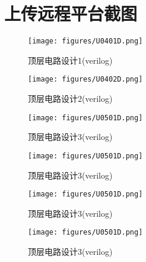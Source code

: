 \documentclass[12pt,hyperref,a4paper,UTF8]{ctexart}
\begin{document}
\section{上传远程平台截图}


\begin{figure}[H]
    \centering
    \begin{minipage}{1\textwidth}
        \centering
        \texttt{[image: figures/U0401D.png]}
        \caption{顶层电路设计1(verilog)}
        \label{fig:system_block_diagram}
    \end{minipage}
\end{figure}

\begin{figure}[H]
    \centering
    \begin{minipage}{1\textwidth}
        \centering
        \texttt{[image: figures/U0402D.png]}
        \caption{顶层电路设计2(verilog)}
        \label{fig:system_block_diagram}
    \end{minipage}
\end{figure}

\begin{figure}[H]
    \centering
    \begin{minipage}{1\textwidth}
        \centering
        \texttt{[image: figures/U0501D.png]}
        \caption{顶层电路设计3(verilog)}
        \label{fig:system_block_diagram}
    \end{minipage}
\end{figure}

\begin{figure}[H]
    \centering
    \begin{minipage}{1\textwidth}
        \centering
        \texttt{[image: figures/U0501D.png]}
        \caption{顶层电路设计3(verilog)}
        \label{fig:system_block_diagram}
    \end{minipage}
\end{figure}

\begin{figure}[H]
    \centering
    \begin{minipage}{1\textwidth}
        \centering
        \texttt{[image: figures/U0501D.png]}
        \caption{顶层电路设计3(verilog)}
        \label{fig:system_block_diagram}
    \end{minipage}
\end{figure}

\begin{figure}[H]
    \centering
    \begin{minipage}{1\textwidth}
        \centering
        \texttt{[image: figures/U0501D.png]}
        \caption{顶层电路设计3(verilog)}
        \label{fig:system_block_diagram}
    \end{minipage}
\end{figure}
\end{document}
